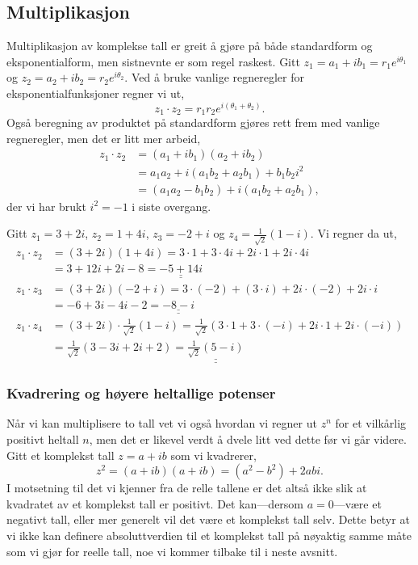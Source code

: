 \documentclass[a4paper,norsk,12pt]{article}
\newcommand{\ans}[1]{\underline{\underline{#1}}}
\newcounter{exa}
\begin{document}
\subsection{Multiplikasjon}
Multiplikasjon av komplekse tall er greit å gjøre på både standardform og eksponentialform, men sistnevnte er som regel raskest. Gitt $z_1 = a_1 + ib_1 = r_1e^{i\theta_1}$ og $z_2 = a_2+ib_2 = r_2e^{i\theta_2}$. Ved å bruke vanlige regneregler for eksponentialfunksjoner regner vi ut,
\begin{displaymath}
	z_1\cdot z_2 = r_1r_2e^{i(\theta_1+\theta_2)}.
\end{displaymath}
Også beregning av produktet på standardform gjøres rett frem med vanlige regneregler, men det er litt mer arbeid,
\begin{align*}
	z_1\cdot z_2 &= (a_1+ib_1)(a_2+ib_2) \\
		&= a_1a_2 + i(a_1b_2+a_2b_1)+b_1b_2i^2 \\
		&= (a_1a_2-b_1b_2) + i (a_1b_2+a_2b_1),
\end{align*}
der vi har brukt $i^2=-1$ i siste overgang.

\begin{texample}
Gitt $z_1 = 3 + 2i$, $z_2=1 + 4i$, $z_3 = -2 + i$ og $z_4 = \frac{1}{\sqrt{2}}(1-i)$. Vi regner da ut,
\begin{align*}
	z_1\cdot z_2 &= (3+2i)(1+4i) = 3\cdot1 + 3\cdot4i + 2i\cdot1 + 2i\cdot 4i \\
	&= 3 +12i+2i -8 = \ans{-5+14i} \\[12pt]
	z_1\cdot z_3 &= (3+2i)(-2+i) = 3\cdot(-2)+(3\cdot i)+2i\cdot(-2) + 2i\cdot i \\
	&= -6 + 3i -4i -2 = \ans{-8 -i} \\[12pt]
	z_1\cdot z_4 &= (3+2i)\cdot\frac{1}{\sqrt{2}}(1-i) = \frac{1}{\sqrt{2}} \left(3\cdot 1 + 3\cdot(-i) + 2i\cdot1 + 2i\cdot(-i) \right)\\
	&= \frac{1}{\sqrt{2}}\left(3-3i+2i+2\right) = \ans{\frac{1}{\sqrt{2}}(5-i)}
\end{align*} 	
\end{texample}

\subsubsection{Kvadrering og høyere heltallige potenser}
Når vi kan multiplisere to tall vet vi også hvordan vi regner ut $z^n$ for et vilkårlig positivt heltall $n$, men det er likevel verdt å dvele litt ved dette før vi går videre. Gitt et komplekst tall $z=a+ib$ som vi kvadrerer,
\begin{displaymath}
	z^2 = (a+ib)(a+ib) = (a^2-b^2) +2abi.
\end{displaymath}
I motsetning til det vi kjenner fra de relle tallene er det altså ikke slik at kvadratet av et komplekst tall er positivt. Det kan---dersom $a=0$---være et negativt tall, eller mer generelt vil det være et komplekst tall selv. Dette betyr at vi ikke kan definere absoluttverdien til et komplekst tall på nøyaktig samme måte som vi gjør for reelle tall, noe vi kommer tilbake til i neste avsnitt. 
\end{document}
